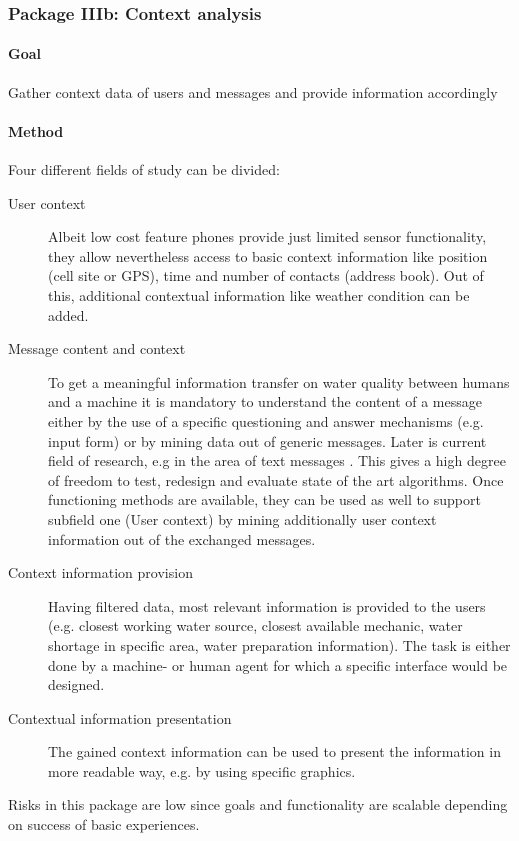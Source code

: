 \documentclass[11pt]{article}
\begin{document}
\subsubsection*{Package IIIb: Context analysis}
\paragraph{Goal} Gather context data of users and messages and provide information accordingly

\paragraph{Method}
Four different fields of study can be divided:
\begin{description}
 \item [User context] Albeit low cost feature phones provide just limited sensor functionality, they allow nevertheless access to basic context information like position (cell site or GPS), time and number of contacts (address book). Out of this, additional contextual information like weather condition can be added.
 \item [Message content and context] To get a meaningful information transfer on water quality between humans and a machine it is mandatory to understand the content of a message either by the use of a specific questioning and answer mechanisms (e.g. input form) or by mining data out of generic messages. Later is current field of research, e.g in the area of text messages \cite{aggarwal2012mining}. This gives a high degree of freedom to test, redesign and evaluate state of the art algorithms. Once functioning methods are available, they can be used as well to support subfield one (User context) by mining additionally user context information out of the exchanged messages. 
 \item [Context information provision] Having filtered data, most relevant information is provided to the users (e.g. closest working water source, closest available mechanic, water shortage in specific area, water preparation information). The task is either done by a machine- or human agent for which a specific interface would be designed.
 \item [Contextual information presentation] The gained context information can be used to present the information in more readable way, e.g. by using specific graphics.
\end{description}

Risks in this package are low since goals and functionality are scalable depending on success of basic experiences.
\end{document}

